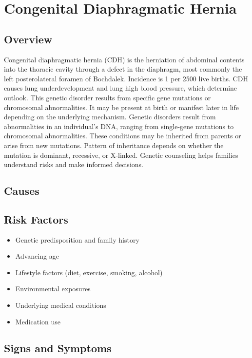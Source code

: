 \chapter{Congenital Diaphragmatic Hernia}
\label{sec:Congenital Diaphragmatic Hernia}

\section{Overview}
Congenital diaphragmatic hernia (CDH) is the herniation of abdominal contents into the thoracic cavity through a defect in the diaphragm, most commonly the left posterolateral foramen of Bochdalek. Incidence is 1 per 2500 live births. CDH causes lung underdevelopment and lung high blood pressure, which determine outlook. This genetic disorder results from specific gene mutations or chromosomal abnormalities. It may be present at birth or manifest later in life depending on the underlying mechanism. Genetic disorders result from abnormalities in an individual's DNA, ranging from single-gene mutations to chromosomal abnormalities. These conditions may be inherited from parents or arise from new mutations. Pattern of inheritance depends on whether the mutation is dominant, recessive, or X-linked. Genetic counseling helps families understand risks and make informed decisions.
\section{Causes}
\section{Risk Factors}

\begin{itemize}[noitemsep]
  \item Genetic predisposition and family history
  \item Advancing age
  \item Lifestyle factors (diet, exercise, smoking, alcohol)
  \item Environmental exposures
  \item Underlying medical conditions
  \item Medication use
\end{itemize}
\section{Signs and Symptoms}

